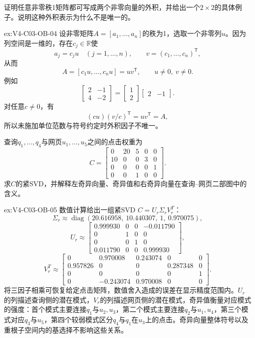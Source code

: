 \begin{SLChapterExercisePairSection}
\begin{exercise}\label{ex:V4-C03-OB-04}
证明任意非零秩1矩阵都可写成两个非零向量的外积，并给出一个$2\times2$的具体例子。说明这种外积表示为什么不是唯一的。
\end{exercise}
\ifSLFullEdition
{}\label{sol:V4-C03-OB-04}
\begin{chapterexercisesolution}{ex:V4-C03-OB-04}
设非零矩阵$A=[a_1,\ldots,a_n]$的秩为1，选取一个非零列$u$。因为列空间是一维的，存在$c_j\in\mathbb R$使
\[
a_j=c_ju\quad(j=1,\ldots,n),
\qquad
v=(c_1,\ldots,c_n)^{\mathsf T},
\]
从而
\[
A=[c_1u,\ldots,c_nu]=uv^{\mathsf T},
\qquad
u\ne0,\ v\ne0.
\]
例如
\[
\begin{bmatrix}2&-1\\4&-2\end{bmatrix}
=\begin{bmatrix}1\\2\end{bmatrix}
\begin{bmatrix}2&-1\end{bmatrix}.
\]
对任意$c\ne0$，有
\[
(cu)(v/c)^{\mathsf T}=uv^{\mathsf T}=A,
\]
所以未施加单位范数与符号约定时外积因子不唯一。
\end{chapterexercisesolution}
\fi

\begin{exercise}\label{ex:V4-C03-OB-05}
查询$q_1,\ldots,q_4$与网页$u_1,\ldots,u_5$之间的点击权重为
\[
C=\begin{bmatrix}
0&20&5&0&0\\
10&0&0&3&0\\
0&0&0&0&1\\
0&0&1&0&0
\end{bmatrix}.
\]
求$C$的紧SVD，并解释左奇异向量、奇异值和右奇异向量在查询--网页二部图中的含义。
\end{exercise}
\ifSLFullEdition
{}\label{sol:V4-C03-OB-05}
\begin{chapterexercisesolution}{ex:V4-C03-OB-05}
数值计算给出一组紧SVD $C=U_r\Sigma_rV_r^T$：
\[
\Sigma_r\approx\operatorname{diag}(20.616958,\ 10.440307,\ 1,\ 0.970075),
\]
\[
U_r\approx
\begin{bmatrix}
0.999930&0&0&-0.011790\\
0&1&0&0\\
0&0&1&0\\
0.011790&0&0&0.999930
\end{bmatrix},
\]
\[
V_r^T\approx
\begin{bmatrix}
0&0.970008&0.243074&0&0\\
0.957826&0&0&0.287348&0\\
0&0&0&0&1\\
0&-0.243074&0.970008&0&0
\end{bmatrix}.
\]
将三因子相乘可恢复给定点击矩阵，数值舍入造成的误差在显示精度范围内。$U_r$的列描述查询侧的潜在模式，$V_r$的列描述网页侧的潜在模式，奇异值衡量对应模式的强度：首个模式主要连接$q_1$与$u_2,u_3$，第二个模式主要连接$q_2$与$u_1,u_4$，第三个模式对应$q_3$与$u_5$，第四个较弱模式区分$q_4$与$q_1$在$u_3$上的点击。奇异向量整体符号以及重根子空间内的基选择不影响这些关系。
\end{chapterexercisesolution}
\fi


\end{SLChapterExercisePairSection}
